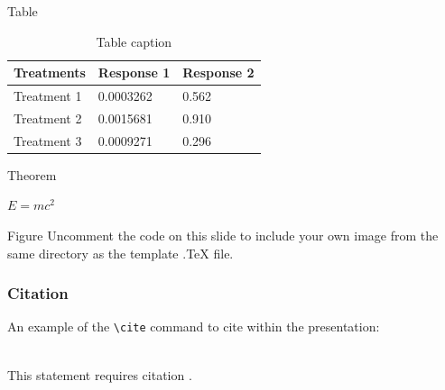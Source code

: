 \documentclass[aspectratio=169,xcolor=dvipsnames]{beamer}
\begin{document}

\begin{frame}{Table}
    \begin{table}
        \begin{tabular}{l l l}
            \toprule
            \textbf{Treatments} & \textbf{Response 1} & \textbf{Response 2} \\
            \midrule
            Treatment 1         & 0.0003262           & 0.562               \\
            Treatment 2         & 0.0015681           & 0.910               \\
            Treatment 3         & 0.0009271           & 0.296               \\
            \bottomrule
        \end{tabular}
        \caption{Table caption}
    \end{table}
\end{frame}


\begin{frame}{Theorem}
    \begin{theorem}
        $E = mc^2$
    \end{theorem}
\end{frame}


\begin{frame}{Figure}
    Uncomment the code on this slide to include your own image from the same directory as the template .TeX file.
\end{frame}


\begin{frame}[fragile] %
    \frametitle{Citation}
    An example of the \verb|\cite| command to cite within the presentation:\\~

    This statement requires citation \cite{p1}.
\end{frame}

\end{document}

